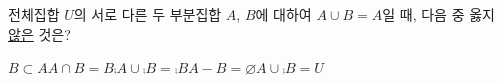 전체집합 $U$의 서로 다른 두 부분집합 $A$, $B$에 대하여 $A\cup B=A$일 때, 다음 중 옳지 \underline{않은} 것은?
\begin{choices32}{$B\subset A$}{$A\cap B=B$}{$\comp{A}\cup\comp{B}=\comp{B}$}{$A-B=\varnothing$}{$A\cup\comp{B}=U$}\end{choices32}
